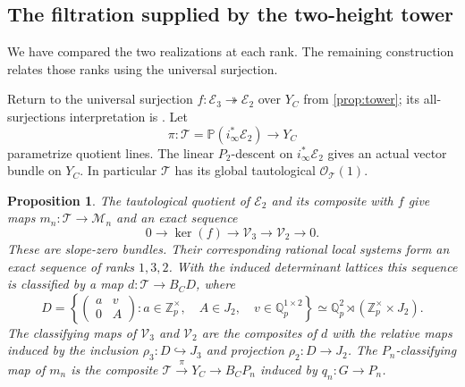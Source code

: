 \documentclass[11pt]{article}
\numberwithin{equation}{section}
\newtheorem{proposition}[theorem]{Proposition}
\theoremstyle{definition}
\theoremstyle{remark}
\begin{document}
\subsection{The filtration supplied by the two-height tower}

We have compared the two realizations at each rank. The remaining
construction relates those ranks using the universal surjection.

Return to the universal surjection
$f:\mathcal E_3\twoheadrightarrow\mathcal E_2$ over $Y_C$ from
\cref{prop:tower}; its all-surjections interpretation is
\cite[Proposition 2.7.1(3)]{BMR2026}.
Let
\[
 \pi:\mathcal T=\mathbb P(i_\infty^*\mathcal E_2)\longrightarrow Y_C
\]
parametrize quotient lines.  The linear $P_2$-descent on
$i_\infty^*\mathcal E_2$ gives an actual vector bundle on $Y_C$.
In particular $\mathcal T$ has its global tautological
$\mathcal O_{\mathcal T}(1)$.

\begin{proposition}\label{prop:filtered-modification}
The tautological quotient of $\mathcal E_2$ and its composite with $f$
give maps $m_n:\mathcal T\to\mathcal M_n$ and an exact sequence
\begin{equation}\label{eq:filtered-modification}
 0\longrightarrow\ker(f)\longrightarrow\mathcal V_3
       \longrightarrow\mathcal V_2\longrightarrow0 .
\end{equation}
These are slope-zero bundles.  Their corresponding rational local
systems form an exact sequence of ranks $1,3,2$.
With the induced determinant lattices this sequence is classified by
a map $d:\mathcal T\to B_CD$, where
\[
 D=\left\{
 \begin{pmatrix}a&v\\0&A\end{pmatrix}:
       a\in\mathbb Z_p^\times,\quad A\in J_2,\quad v\in\mathbb Q_p^{1\times2}
       \right\}
   \simeq\mathbb Q_p^2\rtimes(\mathbb Z_p^\times\times J_2).
\]
The classifying maps of $\mathcal V_3$ and $\mathcal V_2$ are the
composites of $d$ with the relative maps induced by the inclusion
$\rho_3:D\hookrightarrow J_3$ and projection $\rho_2:D\to J_2$.
The $P_n$-classifying map of $m_n$ is the composite
$\mathcal T\xrightarrow{\pi}Y_C\to B_CP_n$ induced by
$q_n:G\to P_n$.
\end{proposition}
\end{document}
